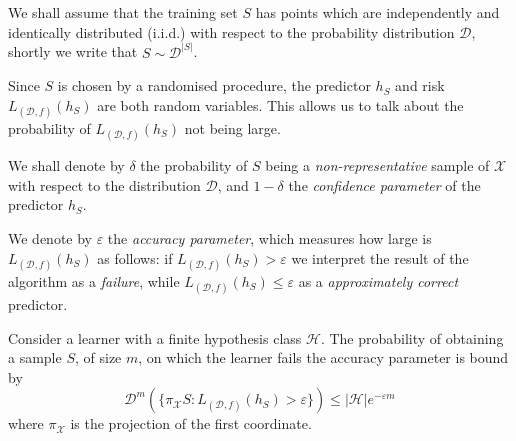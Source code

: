\begin{definition}
\label{def:iid-assumption}
We shall assume that the training set \(S\) has points which are independently
and identically distributed (i.i.d.) with respect to the probability distribution
\(\mathcal{D}\), shortly we write that \(S \sim \mathcal{D}^{|S|}\).
\end{definition}

Since \(S\) is chosen by a randomised procedure, the predictor \(h_S\) and risk
\(L_{(\mathcal{D}, f)}(h_S)\) are both random variables. This allows us to talk
about the probability of \(L_{(\mathcal{D}, f)}(h_S)\) not being large.

\begin{definition}
\label{def:confidence-parameter}
We shall denote by \(\delta\) the probability of \(S\) being a
\emph{non-representative} sample of \(\mathcal{X}\) with respect to the
distribution \(\mathcal{D}\), and \(1 - \delta\) the \emph{confidence parameter}
of the predictor \(h_S\).
\end{definition}

\begin{definition}
\label{def:accuracy-parameter}
We denote by \(\varepsilon\) the \emph{accuracy parameter}, which measures how
large is \(L_{(\mathcal{D}, f)}(h_S)\) as follows: if
\(L_{(\mathcal{D}, f)}(h_S) > \varepsilon\) we interpret the result of the
algorithm as a \emph{failure}, while
\(L_{(\mathcal{D}, f)}(h_S) \leq \varepsilon\) as a \emph{approximately correct}
predictor.
\end{definition}

\begin{proposition}
\label{prop:finite-hypothesis-class-failure-bound}
Consider a learner with a finite hypothesis class \(\mathcal{H}\). The
probability of obtaining a sample \(S\), of size \(m\), on which the learner
fails the accuracy parameter is bound by
\[
\mathcal{D}^m(\{\pi_{\mathcal{X}} S \colon L_{(\mathcal{D}, f)}(h_S) > \varepsilon\})
\leq |\mathcal{H}| e^{-\varepsilon m}
\]
where \(\pi_{\mathcal{X}}\) is the projection of the first coordinate.
\end{proposition}

